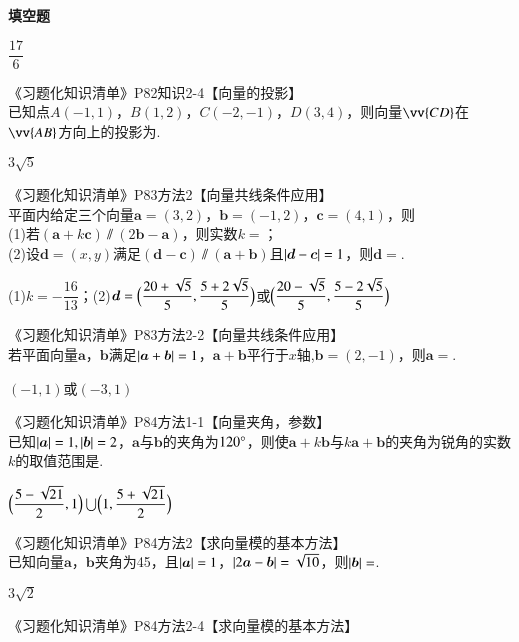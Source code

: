 \begin{exercise}{\bf 填空题}
\begin{answer}
        $\dfrac{17}6$
      \end{answer}
    \item 《习题化知识清单》P82知识2-4【向量的投影】\\
      已知点$A(-1,1)$，$B(1,2)$，$C(-2,-1)$，$D(3,4)$，则向量$\vv{CD}$在$\vv{AB}$方向上的投影为\tk.
      \begin{answer}
        $3\sqrt{5}$
      \end{answer}
    \item 《习题化知识清单》P83方法2【向量共线条件应用】\\
      平面内给定三个向量$\bm a=(3,2)$，$\bm b=(-1,2)$，$\bm c=(4,1)$，则\\
      (1)若$(\bm a+k\bm c)\varparallel(2\bm b-\bm a)$，则实数$k=$\tk；\\
      (2)设$\bm d=(x,y)$满足$(\bm d-\bm c) \varparallel (\bm a+\bm b)$且$\left| \bm d-\bm c \right|=1$，则$\bm d=$\tk.
      \begin{answer}
        (1)$k=-\dfrac{16}{13}$；(2)$\bm d=\Bigl(\dfrac{20+\sqrt{5}}5,\dfrac{5+2\sqrt{5}}5\Bigr)$或$\Bigl(\dfrac{20-\sqrt{5}}5,\dfrac{5-2\sqrt{5}}5\Bigr)$
      \end{answer}
    \item 《习题化知识清单》P83方法2-2【向量共线条件应用】\\
      若平面向量$\bm a$，$\bm b$满足$\left| \bm a+\bm b \right|=1$，$\bm a+\bm b$平行于$x$轴,$\bm b=(2,-1)$，则$\bm a=$\tk.
      \begin{answer}
        $(-1,1)$或$(-3,1)$
      \end{answer}
    \item 《习题化知识清单》P84方法1-1【向量夹角，参数】\\
       已知$\left| \bm a \right|=1,\left| \bm b \right|=2$，$\bm a$与$\bm b$的夹角为$120\degree$，则使$\bm a+k\bm b$与$k\bm a+\bm b$的夹角为锐角的实数$k$的取值范围是\tk[5].
      \begin{answer}
        $\Bigl(\dfrac{5-\sqrt{21}}2,1\Bigr)\bigcup\Bigl(1,\dfrac{5+\sqrt{21}}2\Bigr)$
      \end{answer}
    \item 《习题化知识清单》P84方法2【求向量模的基本方法】\\
      已知向量$\bm a$，$\bm b$夹角为45\degree，且$\left| \bm a \right|=1$，$\left| 2\bm a-\bm b \right|=\sqrt{10}$，则$\left| \bm b \right|=$\tk.
      \begin{answer}
        $3\sqrt{2}$
      \end{answer}
    \item 《习题化知识清单》P84方法2-4【求向量模的基本方法】\\

\end{exercise}
